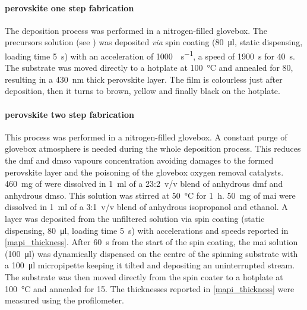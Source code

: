 		\paragraph{ perovskite one step fabrication}
		The deposition process was performed in a nitrogen-filled glovebox.
		The precursors solution (see ) was deposited \textsl{via} spin coating (\SI{80}{\ul}, static dispensing, loading time \SI{5}{\s}) with an acceleration of \SI{1000}{\rpm\per\s}, a speed of \SI{1900}{\s} for \SI{40}{\s}.
		The substrate was moved directly to a hotplate at \SI{100}{\celsius} and annealed for \SI{80}{\min}, resulting in a \SI{430}{\nm} thick perovskite layer.
		The film is colourless just after deposition, then it turns to brown, yellow and finally black on the hotplate.

		\FloatBarrier
		\paragraph{ perovskite two step fabrication}
		This process was performed in a nitrogen-filled glovebox.
		A constant purge of glovebox atmosphere is needed during the whole deposition process.
		This reduces the \gls{dmf} and \gls{dmso} vapours concentration avoiding damages to the formed perovskite layer and the poisoning of the glovebox oxygen removal catalysts.
		\SI{460}{\mg} of  were dissolved in \SI{1}{\ml} of a 23:2~v/v blend of anhydrous \gls{dmf} and anhydrous \gls{dmso}.
		This solution was stirred at \SI{50}{\celsius} for \SI{1}{\hour}.
		\SI{50}{\mg} of \gls{mai} were dissolved in \SI{1}{\ml} of a 3:1~v/v blend of anhydrous isopropanol and ethanol.
		A  layer was deposited from the unfiltered solution via spin coating (static dispensing, \SI{80}{\ul}, loading time \SI{5}{\s}) with accelerations and speeds reported in \cref{mapi_thickness}.
		After \SI{60}{\s} from the start of the spin coating, the \gls{mai} solution (\SI{100}{\ul}) was dynamically dispensed on the centre of the spinning substrate with a \SI{100}{\ul} micropipette keeping it tilted and depositing an uninterrupted stream.
		The substrate was then moved directly from the spin coater to a hotplate at \SI{100}{\celsius} and annealed for \SI{15}{\min}.
		The thicknesses reported in \cref{mapi_thickness} were measured using the profilometer.

